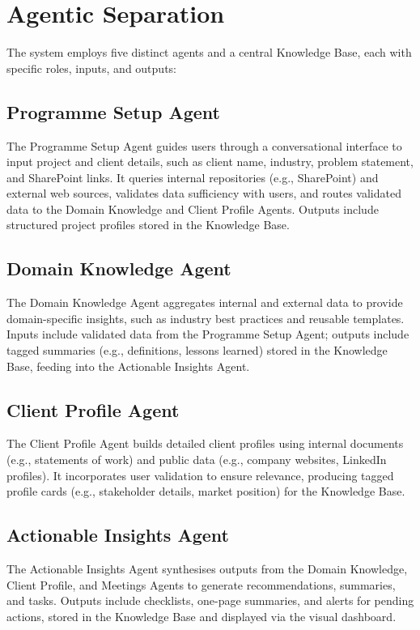 \documentclass{article}
\begin{document}
\section{Agentic Separation}
The system employs five distinct agents and a central Knowledge Base, each with specific roles, inputs, and outputs:

\subsection{Programme Setup Agent}
The Programme Setup Agent guides users through a conversational interface to input project and client details, such as client name, industry, problem statement, and SharePoint links. It queries internal repositories (e.g., SharePoint) and external web sources, validates data sufficiency with users, and routes validated data to the Domain Knowledge and Client Profile Agents. Outputs include structured project profiles stored in the Knowledge Base.

\subsection{Domain Knowledge Agent}
The Domain Knowledge Agent aggregates internal and external data to provide domain-specific insights, such as industry best practices and reusable templates. Inputs include validated data from the Programme Setup Agent; outputs include tagged summaries (e.g., definitions, lessons learned) stored in the Knowledge Base, feeding into the Actionable Insights Agent.

\subsection{Client Profile Agent}
The Client Profile Agent builds detailed client profiles using internal documents (e.g., statements of work) and public data (e.g., company websites, LinkedIn profiles). It incorporates user validation to ensure relevance, producing tagged profile cards (e.g., stakeholder details, market position) for the Knowledge Base.

\subsection{Actionable Insights Agent}
The Actionable Insights Agent synthesises outputs from the Domain Knowledge, Client Profile, and Meetings Agents to generate recommendations, summaries, and tasks. Outputs include checklists, one-page summaries, and alerts for pending actions, stored in the Knowledge Base and displayed via the visual dashboard.
\end{document}
